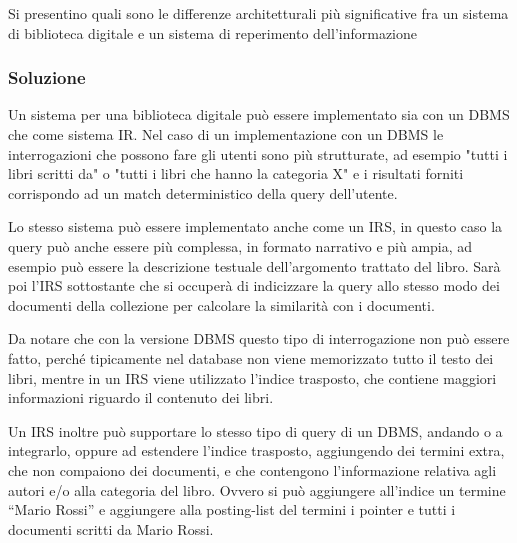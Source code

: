 Si presentino quali sono le differenze architetturali più significative fra un sistema di biblioteca digitale e un sistema di reperimento dell'informazione

\subsubsection{Soluzione}

Un sistema per una biblioteca digitale può essere implementato sia con un DBMS che come sistema IR.
Nel caso di un implementazione con un DBMS le interrogazioni che possono fare gli utenti sono più strutturate, ad esempio "tutti i libri scritti da" o "tutti i libri che hanno la categoria X" e i risultati forniti corrispondo ad un match deterministico della query dell'utente.

Lo stesso sistema può essere implementato anche come un IRS, in questo caso la query può anche essere più complessa, in formato narrativo e più ampia, ad esempio può essere la descrizione testuale dell'argomento trattato del libro.
Sarà poi l'IRS sottostante che si occuperà di indicizzare la query allo stesso modo dei documenti della collezione per calcolare la similarità con i documenti.

Da notare che con la versione DBMS questo tipo di interrogazione non può essere fatto, perché tipicamente nel database non viene memorizzato tutto il testo dei libri, mentre in un IRS viene utilizzato l'indice trasposto, che contiene maggiori informazioni riguardo il contenuto dei libri.

Un IRS inoltre può supportare lo stesso tipo di query di un DBMS, andando o a integrarlo, oppure ad estendere l'indice trasposto, aggiungendo dei termini extra, che non compaiono dei documenti, e che contengono l'informazione relativa agli autori e/o alla categoria del libro. Ovvero si può aggiungere all'indice un termine ``Mario Rossi'' e aggiungere alla posting-list del termini i pointer e tutti i documenti scritti da Mario Rossi.













